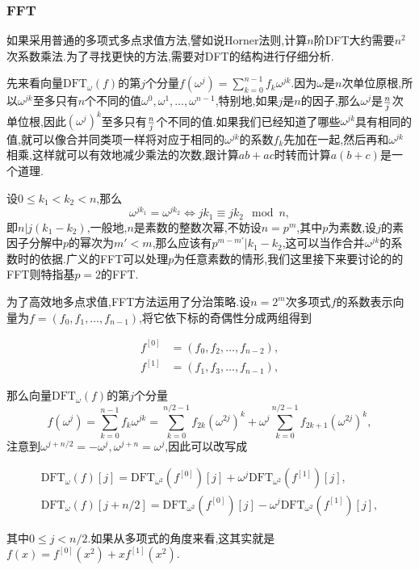 \documentclass{ctexart}
\begin{document}
\subsubsection{FFT}

如果采用普通的多项式多点求值方法,譬如说Horner法则,计算$n$阶DFT大约需要$n^2$次系数乘法.为了寻找更快的方法,需要对DFT的结构进行仔细分析.

先来看向量$\mathrm{DFT}_\omega(f)$的第$j$个分量$f(\omega^j)=\sum\limits_{k=0}^{n-1}f_k\omega^{jk}$.因为$\omega$是$n$次单位原根,所以$\omega^{jk}$至多只有$n$个不同的值$\omega^0,\omega^1,\ldots,\omega^{n-1}$,特别地,如果$j$是$n$的因子,那么$\omega^j$是${n\over j}$次单位根,因此$(\omega^j)^k$至多只有${n\over j}$个不同的值.如果我们已经知道了哪些$\omega^{jk}$具有相同的值,就可以像合并同类项一样将对应于相同的$\omega^{jk}$的系数$f_k$先加在一起,然后再和$\omega^{jk}$相乘,这样就可以有效地减少乘法的次数,跟计算$ab+ac$时转而计算$a(b+c)$是一个道理.

设$0\le k_1<k_2<n$,那么$$\omega^{jk_1}=\omega^{jk_2}\Leftrightarrow jk_1\equiv jk_2\mod n,$$即$n|j(k_1-k_2)$,一般地,$n$是素数的整数次幂,不妨设$n=p^m$,其中$p$为素数,设$j$的素因子分解中$p$的幂次为$m'<m$,那么应该有$p^{m-m'}|k_1-k_2$,这可以当作合并$\omega^{jk}$的系数时的依据.广义的FFT可以处理$p$为任意素数的情形,我们这里接下来要讨论的的FFT则特指基$p=2$的FFT.

为了高效地多点求值,FFT方法运用了分治策略.设$n=2^m$次多项式$f$的系数表示向量为$f=(f_0,f_1,\ldots,f_{n-1})$,将它依下标的奇偶性分成两组得到

\begin{align*}
f^{[0]}&=(f_0,f_2,\ldots,f_{n-2}),\\
f^{[1]}&=(f_1,f_3,\ldots,f_{n-1}),
\end{align*}

那么向量$\mathrm{DFT}_\omega(f)$的第$j$个分量$$f(\omega^j)=\sum_{k=0}^{n-1}f_k\omega^{jk}=\sum_{k=0}^{n/2-1}f_{2k}(\omega^{2j})^k+\omega^j\sum_{k=0}^{n/2-1}f_{2k+1}(\omega^{2j})^k,$$注意到$\omega^{j+n/2}=-\omega^j,\omega^{j+n}=\omega^j$,因此可以改写成

\begin{align*}
\mathrm{DFT}_\omega(f)[j]=\mathrm{DFT}_{\omega^2}(f^{[0]})[j]+\omega^j\mathrm{DFT}_{\omega^2}(f^{[1]})[j],\\
\mathrm{DFT}_\omega(f)[j+n/2]=\mathrm{DFT}_{\omega^2}(f^{[0]})[j]-\omega^j\mathrm{DFT}_{\omega^2}(f^{[1]})[j],
\end{align*}

其中$0\le j<n/2$.如果从多项式的角度来看,这其实就是$f(x)=f^{[0]}(x^2)+xf^{[ 1]}(x^2)$.
\end{document}

